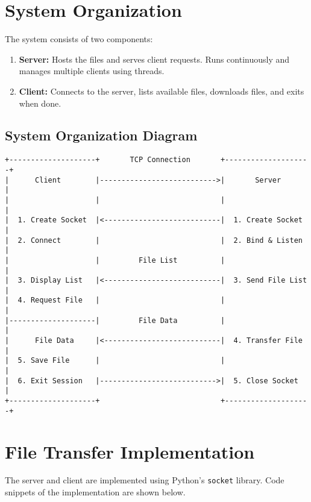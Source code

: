 \documentclass{article}
\begin{document}
\section{System Organization}
The system consists of two components:
\begin{enumerate}
    \item \textbf{Server:} Hosts the files and serves client requests. Runs continuously and manages multiple clients using threads.
    \item \textbf{Client:} Connects to the server, lists available files, downloads files, and exits when done.
\end{enumerate}

\clearpage
\subsection{System Organization Diagram}

\begin{verbatim}
+--------------------+       TCP Connection       +--------------------+
|      Client        |--------------------------->|       Server       |
|                    |                            |                    |
|  1. Create Socket  |<---------------------------|  1. Create Socket  |
|  2. Connect        |                            |  2. Bind & Listen  |
|                    |         File List          |                    |
|  3. Display List   |<---------------------------|  3. Send File List |
|  4. Request File   |                            |                    |
|--------------------|         File Data          |                    |
|      File Data     |<---------------------------|  4. Transfer File  |
|  5. Save File      |                            |                    |
|  6. Exit Session   |--------------------------->|  5. Close Socket   |
+--------------------+                            +--------------------+
\end{verbatim}

\section{File Transfer Implementation}
The server and client are implemented using Python's \texttt{socket} library. Code snippets of the implementation are shown below.
\end{document}
